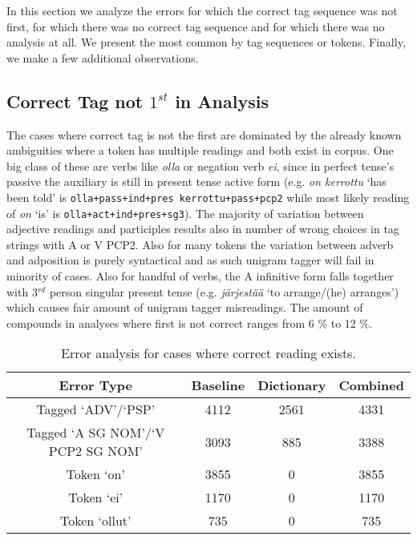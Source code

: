 \documentclass[a4paper]{article}
\begin{document}
In this section we analyze the errors for which the correct tag
sequence was not first, for which there was no correct tag sequence
and for which there was no analysis at all. We present the most common
by tag sequences or tokens. Finally, we make a few
additional observations.

\subsection{Correct Tag not $1^{st}$ in Analysis}

The cases where correct tag is not the first are dominated by the already
known ambiguities where a token has multiple readings and both exist in corpus.
One big class of these are verbs like \emph{olla} or negation verb \emph{ei},
since in perfect tense's passive the auxiliary is still in present tense
active form (e.g. \emph{on kerrottu} `has been told' is 
\texttt{olla+pass+ind+pres kerrottu+pass+pcp2}
while most likely reading of \emph{on} `is' is \texttt{olla+act+ind+pres+sg3}).
The majority of variation between adjective readings and participles results
also in number of wrong choices in tag strings with A or V PCP2. 
Also for many tokens the variation between adverb and adposition is purely
syntactical and as such unigram tagger will fail in minority of cases.
Also for handful of verbs, the A infinitive form falls together with
3${}^{rd}$ person singular present tense (e.g. \emph{järjestää} `to arrange/(he) arranges') which causes fair amount of unigram tagger misreadings. The amount
of compounds in analyses where first is not correct ranges from 6 \% to 12 \%.

\begin{table}[h!]
  \centering
  \caption{Error analysis for cases where correct reading exists.
  }\label{tab:incorrect1}
  \begin{scriptsize}
    \begin{tabular}{c|c|c|c}
      \hline
      Error Type & Baseline & Dictionary & Combined \\
      \hline 
	  Tagged `ADV'/`PSP' & 4112 & 2561 & 4331 \\
	  Tagged `A SG NOM'/`V PCP2 SG NOM' & 3093 & 885 & 3388 \\
	  \hline
	  Token `on' & 3855 & 0 & 3855 \\
	  Token `ei' & 1170 & 0 & 1170 \\
	  Token `ollut' & 735 & 0 & 735 \\
	  \hline 
    \end{tabular}
  \end{scriptsize}
\end{table}
\end{document}
